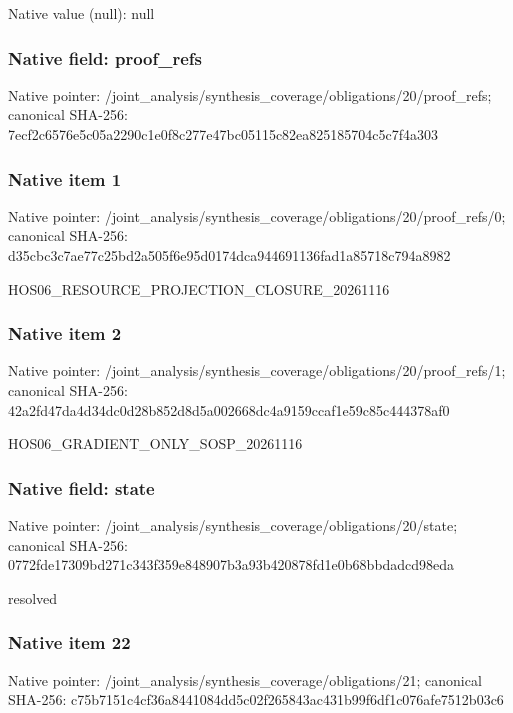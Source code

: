 \documentclass[10pt,a4paper]{article}
\begin{document}
Native value (null): null

\subsubsection{Native field: proof\_\allowbreak{}refs}
Native pointer: /joint\_\allowbreak{}analysis/synthesis\_\allowbreak{}coverage/obligations/20/proof\_\allowbreak{}refs; canonical SHA-256: 7ecf2c6576e5c05a2290c1e0f8c277e47bc05115c82ea825185704c5c7f4a303

\subsubsection{Native item 1}
Native pointer: /joint\_\allowbreak{}analysis/synthesis\_\allowbreak{}coverage/obligations/20/proof\_\allowbreak{}refs/0; canonical SHA-256: d35cbc3c7ae77c25bd2a505f6e95d0174dca944691136fad1a85718c794a8982

\begingroup\raggedright\sloppy HOS06\_\allowbreak{}RESOURCE\_\allowbreak{}PROJECTION\_\allowbreak{}CLOSURE\_\allowbreak{}20261116\par\endgroup

\subsubsection{Native item 2}
Native pointer: /joint\_\allowbreak{}analysis/synthesis\_\allowbreak{}coverage/obligations/20/proof\_\allowbreak{}refs/1; canonical SHA-256: 42a2fd47da4d34dc0d28b852d8d5a002668dc4a9159ccaf1e59c85c444378af0

\begingroup\raggedright\sloppy HOS06\_\allowbreak{}GRADIENT\_\allowbreak{}ONLY\_\allowbreak{}SOSP\_\allowbreak{}20261116\par\endgroup

\subsubsection{Native field: state}
Native pointer: /joint\_\allowbreak{}analysis/synthesis\_\allowbreak{}coverage/obligations/20/state; canonical SHA-256: 0772fde17309bd271c343f359e848907b3a93b420878fd1e0b68bbdadcd98eda

\begingroup\raggedright\sloppy resolved\par\endgroup

\subsubsection{Native item 22}
Native pointer: /joint\_\allowbreak{}analysis/synthesis\_\allowbreak{}coverage/obligations/21; canonical SHA-256: c75b7151c4cf36a8441084dd5c02f265843ac431b99f6df1c076afe7512b03c6
\end{document}
